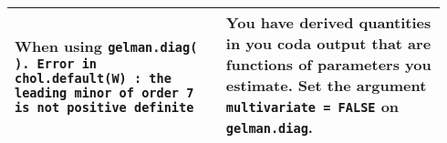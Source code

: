 \documentclass[12pt,english]{article}
\begin{document}
\begin{center}
\begin{longtable}{|p{0.46\linewidth}|p{0.48\linewidth}|}
\hline 
When using \texttt{gelman.diag( ). Error in chol.default(W) : the leading minor of order 7 is not positive definite} & You have derived quantities in you coda output that are functions of parameters you estimate. Set the argument \texttt{multivariate = FALSE} on \texttt{gelman.diag}.\\
\hline 
\end{longtable}
\end{center}




\newpage
\end{document}
